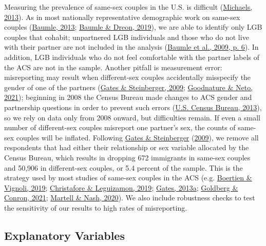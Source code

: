 \documentclass[
  11pt,
]{article}
\begin{document}
Measuring the prevalence of same-sex couples in the U.S. is difficult (\protect\hyperlink{ref-michaels_2013}{Michaels, 2013}). As in most nationally representative demographic work on same-sex couples (\protect\hyperlink{ref-baumle_2013}{Baumle, 2013}; \protect\hyperlink{ref-baumle_2019}{Baumle \& Dreon, 2019}), we are able to identify only LGB couples that cohabit; unpartnered LGB individuals and those who do not live with their partner are not included in the analysis (\protect\hyperlink{ref-baumle_2009}{Baumle et al., 2009, p. 6}). In addition, LGB individuals who do not feel comfortable with the partner labels of the ACS are not in the sample. Another pitfall is measurement error: misreporting may result when different-sex couples accidentally misspecify the gender of one of the partners (\protect\hyperlink{ref-gates_2009}{Gates \& Steinberger, 2009}; \protect\hyperlink{ref-goodnature_2021}{Goodnature \& Neto, 2021}); beginning in 2008 the Census Bureau made changes to ACS gender and partnership questions in order to prevent such errors (\protect\hyperlink{ref-u.s.censusbureau_2013}{U.S. Census Bureau, 2013}), so we rely on data only from 2008 onward, but difficulties remain. If even a small number of different-sex couples misreport one partner's sex, the counts of same-sex couples will be inflated. Following \protect\hyperlink{ref-gates_2009}{Gates \& Steinberger} (\protect\hyperlink{ref-gates_2009}{2009}), we remove all respondents that had either their relationship or sex variable allocated by the Census Bureau, which results in dropping 672 immigrants in same-sex couples and 50,906 in different-sex couples, or 5.4 percent of the sample. This is the strategy used by most studies of same-sex couples in the ACS (e.g. \protect\hyperlink{ref-boertien_2019}{Boertien \& Vignoli, 2019}; \protect\hyperlink{ref-christafore_2019}{Christafore \& Leguizamon, 2019}; \protect\hyperlink{ref-gates_2013}{Gates, 2013a}; \protect\hyperlink{ref-goldberg_2021}{Goldberg \& Conron, 2021}; \protect\hyperlink{ref-martell_2020}{Martell \& Nash, 2020}). We also include robustness checks to test the sensitivity of our results to high rates of misreporting.

\hypertarget{explanatory-variables}{%
\subsection{Explanatory Variables}\label{explanatory-variables}}
\end{document}
